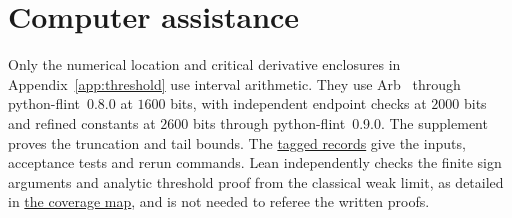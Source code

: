 \section{Computer assistance}\label{sec:verify}

Only the numerical location and critical derivative enclosures in
Appendix~\ref{app:threshold} use interval arithmetic. They use Arb~\cite{johansson2017}
through python-flint~0.8.0 at $1600$ bits, with independent endpoint
checks at $2000$ bits and refined constants at $2600$ bits through
python-flint~0.9.0. The supplement proves the truncation and tail
bounds. The \href{https://github.com/apemm/Kagey-Problems/tree/paperD-ejp-v9/kagey-problems/problem131/paperD}{tagged records}
give the inputs, acceptance tests and rerun commands.
Lean independently checks the finite sign arguments and analytic
threshold proof from the classical weak limit, as detailed in
\href{https://github.com/apemm/Kagey-Problems/blob/paperD-ejp-v9/kagey-problems/problem131/lean/PaperD/MAP.md}{the coverage map},
and is not needed to referee the written proofs.
